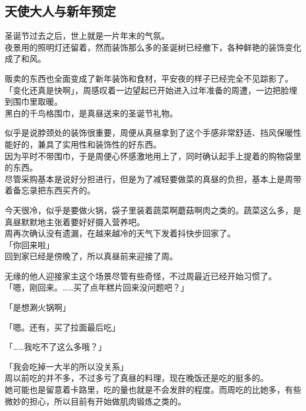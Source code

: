 \subsection{天使大人与新年预定}

圣诞节过去之后，世上就是一片年末的气氛。\\

夜景用的照明灯还留着，然而装饰那么多的圣诞树已经撤下，各种鲜艳的装饰变化成了和风。

贩卖的东西也全面变成了新年装饰和食材，平安夜的样子已经完全不见踪影了。\\

「变化还真是快啊」，周感叹着一边望起已开始进入过年准备的周遭，一边把脸埋到围巾里取暖。\\

黑白的千鸟格围巾，是真昼送来的圣诞节礼物。

似乎是说脖颈处的装饰很重要，周便从真昼拿到了这个手感非常舒适、挡风保暖性能好的，兼具了实用性和装饰性的好东西。\\

因为平时不带围巾，于是周便心怀感激地用上了，同时确认起手上提着的购物袋里的东西。\\

尽管采购基本是说好分担进行，但是为了减轻要做菜的真昼的负担，基本上是周带着备忘录把东西买齐的。

今天很冷，似乎是要做火锅，袋子里装着蔬菜啊蘑菇啊肉之类的。蔬菜这么多，是真昼默默地主张着要好好摄入营养吧。\\

周再次确认没有遗漏，在越来越冷的天气下发着抖快步回家了。\\

「你回来啦」\\

回到家已经是傍晚了，所以真昼前来迎接了周。

无缘的他人迎接家主这个场景尽管有些奇怪，不过周最近已经开始习惯了。\\

「嗯，刚回来。……买了点年糕片回来没问题吧？」

「是想涮火锅啊」

「嗯。还有，买了拉面最后吃」

「……我吃不了这么多哦？」

「我会吃掉一大半的所以没关系」\\

周以前吃的并不多，不过多亏了真昼的料理，现在晚饭还是吃的挺多的。\\

她可能也是留意着卡路里，吃的量也就是不会发胖的程度。而周吃的比她多，有些微妙的担心，所以目前有开始做肌肉锻炼之类的。\\

